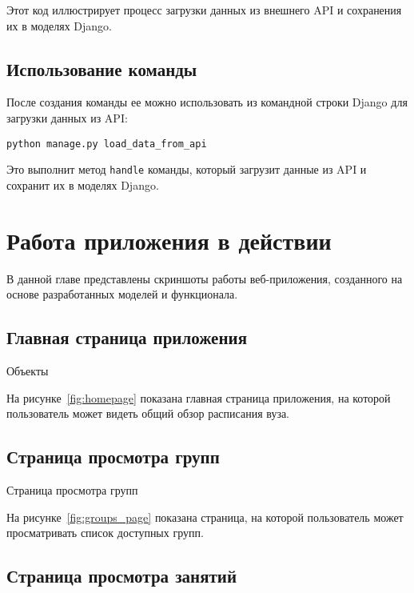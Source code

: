 Этот код иллюстрирует процесс загрузки данных из внешнего API
и сохранения их в моделях Django.

\subsection{Использование команды}

После создания команды ее можно использовать
из командной строки Django для загрузки данных из API:

\begin{verbatim}
python manage.py load_data_from_api
\end{verbatim}

Это выполнит метод \texttt{handle} команды, который загрузит данные из API и сохранит их в моделях Django.

\section{Работа приложения в действии}

В данной главе представлены скриншоты работы веб-приложения,
созданного на основе разработанных моделей и функционала.

\subsection{Главная страница приложения}

\begin{image}
	\caption{Объекты}
    \label{fig:homepage}
\end{image}

На рисунке~\ref{fig:homepage} показана главная страница приложения, на которой пользователь может видеть общий обзор расписания вуза.

\subsection{Страница просмотра групп}

\begin{image}
    \caption{Страница просмотра групп}
    \label{fig:groups_page}
\end{image}

На рисунке~\ref{fig:groups_page} показана страница,
на которой пользователь может просматривать список доступных групп.

\subsection{Страница просмотра занятий}

